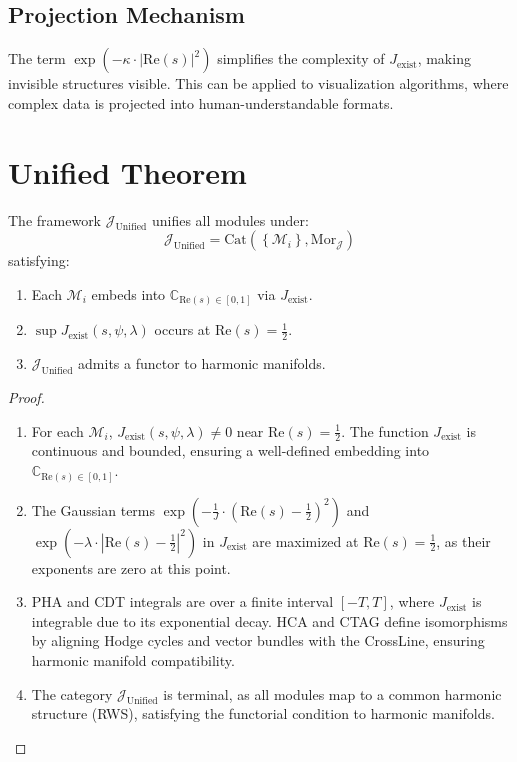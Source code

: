 \documentclass[12pt]{article}
\begin{document}
{{{\begin{onehalfspace}
\subsection*{Projection Mechanism}
The term \( \exp\left(-\kappa \cdot |\text{Re}(s)|^2\right) \) simplifies the complexity of \( J_{\text{exist}} \), making invisible structures visible. This can be applied to visualization algorithms, where complex data is projected into human-understandable formats.

\section{Unified Theorem}

\begin{theorem}
The framework \( \mathcal{J}_{\text{Unified}} \) unifies all modules under:
\[
\mathcal{J}_{\text{Unified}} = \text{Cat}\left( \left\{ \mathcal{M}_i \right\}, \text{Mor}_{\mathcal{J}} \right)
\]
satisfying:
\begin{enumerate}
    \item Each \( \mathcal{M}_i \) embeds into \( \mathbb{C}_{\text{Re}(s) \in [0,1]} \) via \( J_{\text{exist}} \).
    \item \( \sup J_{\text{exist}}(s, \psi, \lambda) \) occurs at \( \text{Re}(s) = \frac{1}{2} \).
    \item \( \mathcal{J}_{\text{Unified}} \) admits a functor to harmonic manifolds.
\end{enumerate}
\end{theorem}

\begin{proof}
\begin{enumerate}
    \item For each \( \mathcal{M}_i \), \( J_{\text{exist}}(s, \psi, \lambda) \neq 0 \) near \( \text{Re}(s) = \frac{1}{2} \). The function \( J_{\text{exist}} \) is continuous and bounded, ensuring a well-defined embedding into \( \mathbb{C}_{\text{Re}(s) \in [0,1]} \).
    \item The Gaussian terms \( \exp\left(-\frac{1}{J} \cdot \left(\text{Re}(s) - \frac{1}{2}\right)^2\right) \) and \( \exp\left(-\lambda \cdot \left|\text{Re}(s) - \frac{1}{2}\right|^2\right) \) in \( J_{\text{exist}} \) are maximized at \( \text{Re}(s) = \frac{1}{2} \), as their exponents are zero at this point.
    \item PHA and CDT integrals are over a finite interval \( [-T, T] \), where \( J_{\text{exist}} \) is integrable due to its exponential decay. HCA and CTAG define isomorphisms by aligning Hodge cycles and vector bundles with the CrossLine, ensuring harmonic manifold compatibility.
    \item The category \( \mathcal{J}_{\text{Unified}} \) is terminal, as all modules map to a common harmonic structure (RWS), satisfying the functorial condition to harmonic manifolds.
\end{enumerate}
\end{proof}


\end{onehalfspace}}}}
\end{document}
